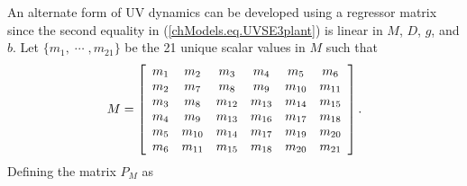 An alternate form of \ac{UV} dynamics can be developed using a
regressor matrix since the second equality in
(\ref{chModels.eq.UVSE3plant}) is linear in $M$, $D$, $g$, and $b$.
Let $\{m_1,\;\cdots\;,m_{21}\}$ be the 21 unique scalar values in $M$
such that
%
\begin{equation}
\ssp
  M=\left[\begin{array}{cccccc}
      m_{1} & m_{2} & m_{3} & m_{4} & m_{5} & m_{6} \\
      m_{2} & m_{7} & m_{8} & m_{9} & m_{10} & m_{11} \\
      m_{3} & m_{8} & m_{12} & m_{13} & m_{14} & m_{15} \\
      m_{4} & m_{9} & m_{13} & m_{16} & m_{17} & m_{18} \\
      m_{5} & m_{10} & m_{14} & m_{17} & m_{19} & m_{20} \\
      m_{6} & m_{11} & m_{15} & m_{18} & m_{20} & m_{21} 
\end{array}\right].  
\end{equation}
%
Defining the matrix $P_M$ as
%
